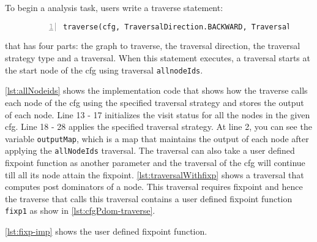 

To begin a analysis task, users write a traverse statement:

\begin{figure}[ht!]
	\begin{lstlisting}[numbers=left, tabsize=4, escapechar=@,label={lst:traverse-syntax}] 
	traverse(cfg, TraversalDirection.BACKWARD, TraversalKind.DFS, allnodeIds);
	\end{lstlisting}
\end{figure}

that has four parts: the graph to traverse, the traversal direction, the traversal strategy type and a traversal. When this statement executes, a traversal starts at the start node of the cfg using traversal \lstinline|allnodeIds|. 

 

\ref{lst:allNodeids} shows the implementation code that shows how the traverse calls each node of the cfg using the specified traversal strategy and stores the output of each node.
Line 13 - 17 initializes the visit status for all the nodes in the given cfg. Line 18 - 28 applies the specified traversal strategy. At line 2, you can see the variable \lstinline|outputMap|, which is a map that maintains the output of each node after applying the \lstinline|allNodeIds| traversal.
The traversal can also take a user defined fixpoint function as another parameter and the traversal of the cfg will continue till all its node attain the fixpoint.
\ref{lst:traversalWithfixp} shows a traversal that computes post dominators of a node. This traversal requires fixpoint and hence the traverse that calls this traversal contains a user defined fixpoint function \lstinline|fixp1| as show in \ref{lst:cfgPdom-traverse}.

\ref{lst:fixp-imp} shows the user defined fixpoint function.




